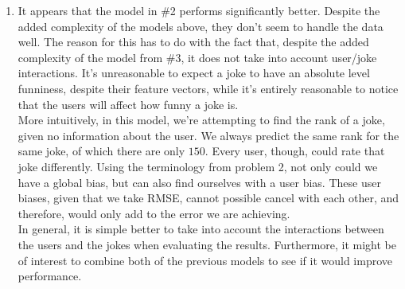 \documentclass{harvardml}
\theoremstyle{plain}
\begin{document}
\begin{enumerate}
\vspace{-0.1cm}
\item It appears that the model in \#2 performs significantly better. Despite the added complexity of the models above, they don't seem to handle the data well. The reason for this has to do with the fact that, despite the added complexity of the model from \#3, it does not take into account user/joke interactions. It's unreasonable to expect a joke to have an absolute level funniness, despite their feature vectors, while it's entirely reasonable to notice that the users will affect how funny a joke is.\\

More intuitively, in this model, we're attempting to find the rank of a joke, given no information about the user. We always predict the same rank for the same joke, of which there are only $150$. Every user, though, could rate that joke differently. Using the terminology from problem 2, not only could we have a global bias, but can also find ourselves with a user bias. These user biases, given that we take RMSE, cannot possible cancel with each other, and therefore, would only add to the error we are achieving. \\

In general, it is simple better to take into account the interactions between the users and the jokes when evaluating the results. Furthermore, it might be of interest to combine both of the previous models to see if it would improve performance.
\end{enumerate}
\end{document}
